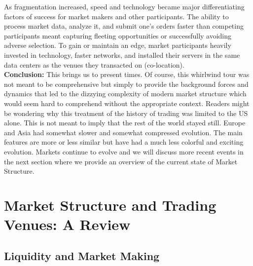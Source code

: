 As fragmentation increased, speed and technology became major differentiating factors of success for market makers and other participants. The ability to process market data, analyze it, and submit one's orders faster than competing participants meant capturing fleeting opportunities or successfully avoiding adverse selection. To gain or maintain an edge, market participants heavily invested in technology, faster networks, and installed their servers in the same data centers as the venues they transacted on (co-location). \\


\noindent\textbf{Conclusion:} This brings us to present times. Of course, this whirlwind tour was not meant to be comprehensive but simply to provide the background forces and dynamics that led to the dizzying complexity of modern market structure which would seem hard to comprehend without the appropriate context. Readers might be wondering why this treatment of the history of trading was limited to the US alone. This is not meant to imply that the rest of the world stayed still. Europe and Asia had somewhat slower and somewhat compressed evolution. The main features are more or less similar but have had a much less colorful and exciting evolution. Markets continue to evolve and we will discuss more recent events in the next section where we provide an overview of the current state of Market Structure.



\section{Market Structure and Trading Venues: A Review}

\subsection{Liquidity and Market Making}


